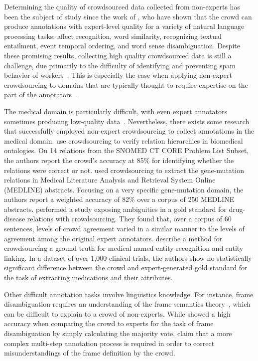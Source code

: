 Determining the quality of crowdsourced data collected from non-experts has been the subject of study since the work of \citet{Snow:2008}, who have shown that the crowd can produce annotations with expert-level quality for a variety of natural language processing tasks: affect  recognition, word similarity, recognizing textual entailment, event temporal ordering, and word sense disambiguation. Despite these promising results, collecting high quality crowdsourced data is still a challenge, due primarily to the difficulty of identifying and preventing spam behavior of workers~\cite{difallah2012mechanical,demartini2012zencrowd}. This is especially the case when applying non-expert crowdsourcing to domains that are typically thought to require expertise on the part of the annotators~\cite{callison2010creating}.

The medical domain is particularly difficult, with even expert annotators sometimes producing low-quality data~\cite{Marcheggiani:2017:ELT:3139489.3106235}. Nevertheless, there exists some research that successfully employed non-expert crowdsourcing to collect annotations in the medical domain. \citet{mortensen2013crowdsourcing} use crowdsourcing to verify relation hierarchies in biomedical ontologies. On 14 relations from the SNOMED CT CORE Problem List Subset, the authors report the crowd's accuracy at 85\% for identifying whether the relations were correct or not. \citet{burger2012validating} used crowdsourcing to extract the gene-mutation relations in Medical Literature Analysis and Retrieval System Online (MEDLINE) abstracts. Focusing on a very specific gene-mutation domain, the authors report a weighted accuracy of 82\% over a corpus of 250 MEDLINE abstracts. \citet{li2015exposing} performed a study exposing ambiguities in a gold standard for drug-disease relations with crowdsourcing. They found that, over a corpus of 60 sentences, levels  of  crowd agreement varied in a similar manner to the levels of agreement  among  the  original  expert  annotators. \citet{zhai2013web} describe a method for crowdsourcing a ground truth for medical named entity recognition and entity linking. In a dataset of over 1,000 clinical trials, the authors show no statistically significant difference between the crowd and expert-generated gold standard for the task of extracting medications and their attributes.

Other difficult annotation tasks involve linguistics knowledge. For instance, frame disambiguation requires an understanding of the frame semantics theory~\cite{baker1998berkeley}, which can be difficult to explain to a crowd of non-experts. While \citet{Hong:2011:GCR:2018966.2018970} showed a high accuracy when comparing the crowd to experts for the task of frame disambiguation by simply calculating the majority vote, \citet{chang2015scaling} claim that a more complex multi-step annotation process is required in order to correct misunderstandings of the frame definition by the crowd.

